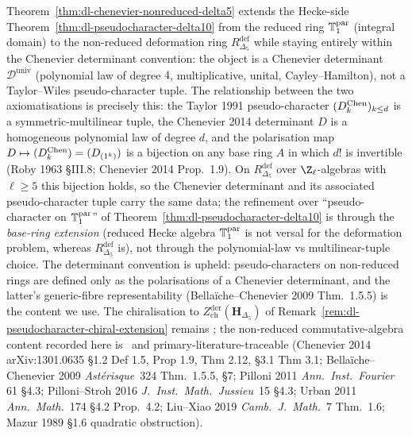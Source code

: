 \begin{remark}
\label{rem:dl-chenevier-nonreduced-chiral-bridge}
Theorem~\ref{thm:dl-chenevier-nonreduced-delta5} extends the
Hecke-side Theorem~\ref{thm:dl-pseudocharacter-delta10} from the
reduced ring $\mathbb{T}^{\mathrm{par}}_1$ (integral domain) to the non-reduced
deformation ring $R^{\mathrm{def}}_{\Delta_5}$ while staying
entirely within the Chenevier determinant convention: the object is
a Chenevier determinant $\mathcal D^{\mathrm{univ}}$ (polynomial law
of degree $4$, multiplicative, unital, Cayley--Hamilton), not a
Taylor--Wiles pseudo-character tuple. The relationship between the
two axiomatisations is precisely this: the Taylor 1991
pseudo-character $(D^{\mathrm{Chen}}_k)_{k\le d}$ is a symmetric-multilinear
tuple, the Chenevier 2014 determinant $D$ is a homogeneous polynomial
law of degree $d$, and the polarisation map
$D\mapsto (D^{\mathrm{Chen}}_k) = (D_{(1^k)})$ is a bijection on any base ring $A$
in which $d!$ is invertible (Roby 1963 \S III.8; Chenevier 2014
Prop.~1.9). On $R^{\mathrm{def}}_{\Delta_5}$ over
$\Z_\ell$-algebras with $\ell\ge 5$ this bijection holds, so the
Chenevier determinant and its associated pseudo-character tuple
carry the same data; the refinement over
``pseudo-character on $\mathbb{T}^{\mathrm{par}}_1$'' of
Theorem~\ref{thm:dl-pseudocharacter-delta10} is through the
\emph{base-ring extension} (reduced Hecke algebra $\mathbb{T}^{\mathrm{par}}_1$ is not
versal for the deformation problem, whereas $R^{\mathrm{def}}_{\Delta_5}$
is), not through the polynomial-law vs multilinear-tuple choice.
The determinant convention is upheld: pseudo-characters
on non-reduced rings are defined only as the polarisations of a
Chenevier determinant, and the latter's generic-fibre representability
(Bellaï\-che--Chenevier 2009 Thm.~1.5.5) is the content we use.
The chiralisation to
$Z^{\mathrm{der}}_{\mathrm{ch}}(\mathbf H_{\Delta_5})$ of
Remark~\ref{rem:dl-pseudocharacter-chiral-extension} remains
\ClaimStatusConjectured; the non-reduced commutative-algebra content
recorded here is
\ClaimStatusProvedHere\ and primary-literature-traceable
(Chenevier 2014 arXiv:1301.0635 \S1.2 Def 1.5, Prop 1.9, Thm 2.12,
\S3.1 Thm 3.1;
Bellaï\-che--Chenevier 2009 \emph{Astérisque}\ 324 Thm.~1.5.5, \S7;
Pilloni 2011 \emph{Ann.\ Inst.\ Fourier} 61 \S4.3;
Pilloni--Stroh 2016 \emph{J.~Inst.\ Math.\ Jussieu}\ 15 \S4.3;
Urban 2011 \emph{Ann.\ Math.}\ 174 \S4.2 Prop.~4.2;
Liu--Xiao 2019 \emph{Camb.\ J.\ Math.}\ 7 Thm.~1.6;
Mazur 1989 \S1.6 quadratic obstruction).
\end{remark}

